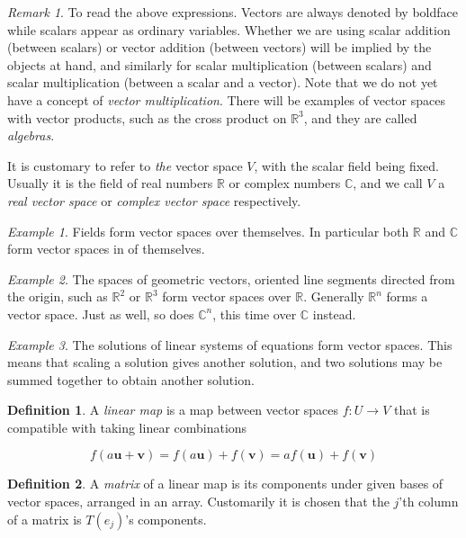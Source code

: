\documentclass[12pt]{article}
\theoremstyle{definition}
\newtheorem{definition}{Definition}[section]
\theoremstyle{remark}
\newtheorem*{remark}{Remark}
\theoremstyle{example}
\newtheorem{example}{Example}
\def\b#1{\textbf{#1}}
\begin{document}
\begin{remark}
	To read the above expressions. Vectors are always denoted by boldface while scalars appear as ordinary variables. Whether we are using scalar addition (between scalars) or vector addition (between vectors) will be implied by the objects at hand, and similarly for scalar multiplication (between scalars) and scalar multiplication (between a scalar and a vector). Note that we do not yet have a concept of \textit{vector multiplication}. There will be examples of vector spaces with vector products, such as the cross product on $\mathbb{R}^3$, and they are called \textit{algebras}.
	
	It is customary to refer to \textit{the} vector space $V$, with the scalar field being fixed. Usually it is the field of real numbers $\mathbb{R}$ or complex numbers $\mathbb{C}$, and we call $V$ a \textit{real vector space} or \textit{complex vector space} respectively.
\end{remark}

\begin{example}
	Fields form vector spaces over themselves. In particular both $\mathbb{R}$ and $\mathbb{C}$ form vector spaces in of themselves.
\end{example}

\begin{example}
	The spaces of geometric vectors, oriented line segments directed from the origin, such as $\mathbb{R}^2$ or $\mathbb{R}^3$ form vector spaces over $\mathbb{R}$. Generally $\mathbb{R}^n$ forms a vector space. Just as well, so does $\mathbb{C}^n$, this time over $\mathbb{C}$ instead.
\end{example}

\begin{example}
	The solutions of linear systems of equations form vector spaces. This means that scaling a solution gives another solution, and two solutions may be summed together to obtain another solution.
\end{example}

\begin{definition}
	A \textit{linear map} is a map between vector spaces $f:U\to V$ that is compatible with taking linear combinations
	
	\begin{equation}
		f(a\b{u}+\b{v}) = f(a\b{u})+f(\b{v})=af(\b{u})+f(\b{v})
	\end{equation}
\end{definition}

\begin{definition}
	A \textit{matrix} of a linear map is its components under given bases of vector spaces, arranged in an array. Customarily it is chosen that the $j$'th column of a matrix is $T(e_j)$'s components.
\end{definition}
\end{document}
